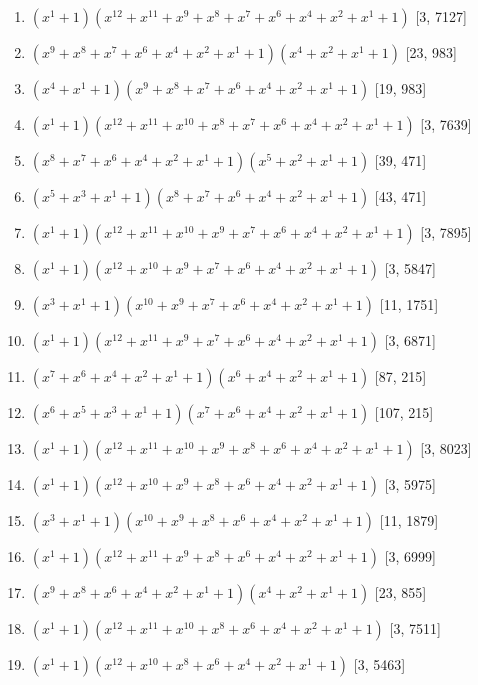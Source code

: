\documentclass[10pt,twocolumn]{article}
\begin{document}
\begin{enumerate}
\item $(x^{1} + 1)(x^{12} + x^{11} + x^{9} + x^{8} + x^{7} + x^{6} + x^{4} + x^{2} + x^{1} + 1)$  [3, 7127]
\item $(x^{9} + x^{8} + x^{7} + x^{6} + x^{4} + x^{2} + x^{1} + 1)(x^{4} + x^{2} + x^{1} + 1)$  [23, 983]
\item $(x^{4} + x^{1} + 1)(x^{9} + x^{8} + x^{7} + x^{6} + x^{4} + x^{2} + x^{1} + 1)$  [19, 983]
\item $(x^{1} + 1)(x^{12} + x^{11} + x^{10} + x^{8} + x^{7} + x^{6} + x^{4} + x^{2} + x^{1} + 1)$  [3, 7639]
\item $(x^{8} + x^{7} + x^{6} + x^{4} + x^{2} + x^{1} + 1)(x^{5} + x^{2} + x^{1} + 1)$  [39, 471]
\item $(x^{5} + x^{3} + x^{1} + 1)(x^{8} + x^{7} + x^{6} + x^{4} + x^{2} + x^{1} + 1)$  [43, 471]
\item $(x^{1} + 1)(x^{12} + x^{11} + x^{10} + x^{9} + x^{7} + x^{6} + x^{4} + x^{2} + x^{1} + 1)$  [3, 7895]
\item $(x^{1} + 1)(x^{12} + x^{10} + x^{9} + x^{7} + x^{6} + x^{4} + x^{2} + x^{1} + 1)$  [3, 5847]
\item $(x^{3} + x^{1} + 1)(x^{10} + x^{9} + x^{7} + x^{6} + x^{4} + x^{2} + x^{1} + 1)$  [11, 1751]
\item $(x^{1} + 1)(x^{12} + x^{11} + x^{9} + x^{7} + x^{6} + x^{4} + x^{2} + x^{1} + 1)$  [3, 6871]
\item $(x^{7} + x^{6} + x^{4} + x^{2} + x^{1} + 1)(x^{6} + x^{4} + x^{2} + x^{1} + 1)$  [87, 215]
\item $(x^{6} + x^{5} + x^{3} + x^{1} + 1)(x^{7} + x^{6} + x^{4} + x^{2} + x^{1} + 1)$  [107, 215]
\item $(x^{1} + 1)(x^{12} + x^{11} + x^{10} + x^{9} + x^{8} + x^{6} + x^{4} + x^{2} + x^{1} + 1)$  [3, 8023]
\item $(x^{1} + 1)(x^{12} + x^{10} + x^{9} + x^{8} + x^{6} + x^{4} + x^{2} + x^{1} + 1)$  [3, 5975]
\item $(x^{3} + x^{1} + 1)(x^{10} + x^{9} + x^{8} + x^{6} + x^{4} + x^{2} + x^{1} + 1)$  [11, 1879]
\item $(x^{1} + 1)(x^{12} + x^{11} + x^{9} + x^{8} + x^{6} + x^{4} + x^{2} + x^{1} + 1)$  [3, 6999]
\item $(x^{9} + x^{8} + x^{6} + x^{4} + x^{2} + x^{1} + 1)(x^{4} + x^{2} + x^{1} + 1)$  [23, 855]
\item $(x^{1} + 1)(x^{12} + x^{11} + x^{10} + x^{8} + x^{6} + x^{4} + x^{2} + x^{1} + 1)$  [3, 7511]
\item $(x^{1} + 1)(x^{12} + x^{10} + x^{8} + x^{6} + x^{4} + x^{2} + x^{1} + 1)$  [3, 5463]

\end{enumerate}
\end{document}
